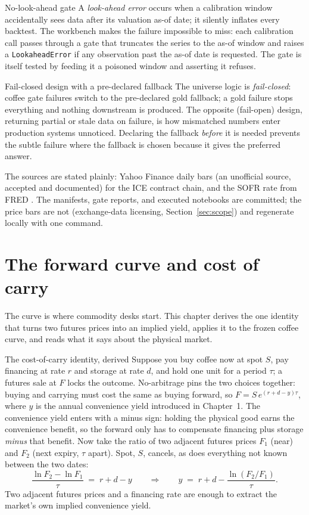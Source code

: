 \documentclass[11pt,a4paper]{article}
\begin{document}
\begin{concept}{No-look-ahead gate}
A \emph{look-ahead error} occurs when a calibration window accidentally
sees data after its valuation as-of date; it silently inflates every
backtest. The workbench makes the failure impossible to miss: each
calibration call passes through a gate that truncates the series to the
as-of window and raises a \texttt{LookaheadError} if any observation past
the as-of date is requested. The gate is itself tested by feeding it a
poisoned window and asserting it refuses.
\end{concept}

\begin{concept}{Fail-closed design with a pre-declared fallback}
The universe logic is \emph{fail-closed}: coffee gate failures switch to
the pre-declared gold fallback; a gold failure stops everything and
nothing downstream is produced. The opposite (fail-open) design, returning
partial or stale data on failure, is how mismatched numbers enter
production systems unnoticed. Declaring the fallback \emph{before} it is
needed prevents the subtle failure where the fallback is chosen because it
gives the preferred answer.
\end{concept}

The sources are stated plainly: Yahoo Finance daily bars (an unofficial
source, accepted and documented) for the ICE contract chain, and the SOFR
rate from FRED \cite{fredsofr}. The manifests, gate reports, and executed
notebooks are committed; the price bars are not (exchange-data licensing,
Section~\ref{sec:scope}) and regenerate locally with one command.

\section{The forward curve and cost of carry}
\label{ch:carry}

The curve is where commodity desks start. This chapter derives the one
identity that turns two futures prices into an implied yield, applies it to
the frozen coffee curve, and reads what it says about the physical market.

\begin{concept}{The cost-of-carry identity, derived}
Suppose you buy coffee now at spot $S$, pay financing at rate $r$ and
storage at rate $d$, and hold one unit for a period $\tau$; a futures sale
at $F$ locks the outcome. No-arbitrage pins the two choices together:
buying and carrying must cost the same as buying forward, so
$F = S\,e^{(r+d-y)\tau}$, where $y$ is the annual convenience yield
introduced in Chapter~1. The convenience yield enters with a minus sign:
holding the physical good earns the convenience benefit, so the forward
only has to compensate financing plus storage \emph{minus} that benefit.
Now take the ratio of two adjacent futures prices $F_1$ (near) and $F_2$
(next expiry, $\tau$ apart). Spot, $S$, cancels, as does everything not
known between the two dates:
\[
  \frac{\ln F_2 - \ln F_1}{\tau} \;=\; r + d - y
  \qquad\Longrightarrow\qquad
  y \;=\; r + d - \frac{\ln(F_2/F_1)}{\tau}.
\]
Two adjacent futures prices and a financing rate are enough to extract the
market's own implied convenience yield.
\end{concept}
\end{document}
